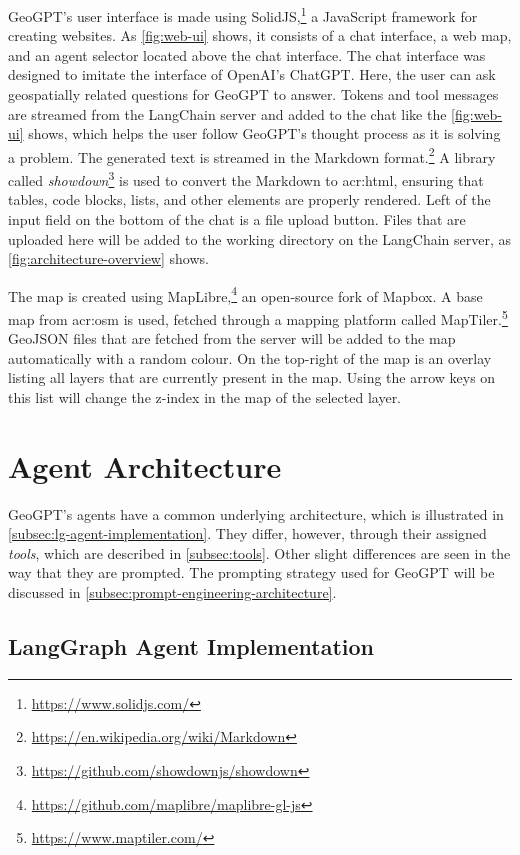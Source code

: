 GeoGPT's user interface is made using SolidJS,\footnote{\url{https://www.solidjs.com/}} a JavaScript framework for creating websites. As \autoref{fig:web-ui} shows, it consists of a chat interface, a web map, and an agent selector located above the chat interface. The chat interface was designed to imitate the interface of OpenAI's ChatGPT. Here, the user can ask geospatially related questions for GeoGPT to answer. Tokens and tool messages are streamed from the LangChain server and added to the chat like the \autoref{fig:web-ui} shows, which helps the user follow GeoGPT's thought process as it is solving a problem. The generated text is streamed in the Markdown format.\footnote{\url{https://en.wikipedia.org/wiki/Markdown}} A library called \textit{showdown}\footnote{\url{https://github.com/showdownjs/showdown}} is used to convert the Markdown to \acrshort{acr:html}, ensuring that tables, code blocks, lists, and other elements are properly rendered. Left of the input field on the bottom of the chat is a file upload button. Files that are uploaded here will be added to the working directory on the LangChain server, as \autoref{fig:architecture-overview} shows.

The map is created using MapLibre,\footnote{\url{https://github.com/maplibre/maplibre-gl-js}} an open-source fork of Mapbox. A base map from \gls{acr:osm} is used, fetched through a mapping platform called MapTiler.\footnote{\url{https://www.maptiler.com/}} GeoJSON files that are fetched from the server will be added to the map automatically with a random colour. On the top-right of the map is an overlay listing all layers that are currently present in the map. Using the arrow keys on this list will change the z-index in the map of the selected layer.


\section{Agent Architecture}
\label{sec:agent-architecture}

GeoGPT's agents have a common underlying architecture, which is illustrated in \autoref{subsec:lg-agent-implementation}. They differ, however, through their assigned \textit{tools}, which are described in \autoref{subsec:tools}. Other slight differences are seen in the way that they are prompted. The prompting strategy used for GeoGPT will be discussed in \autoref{subsec:prompt-engineering-architecture}.

\subsection{LangGraph Agent Implementation}
\label{subsec:lg-agent-implementation}

